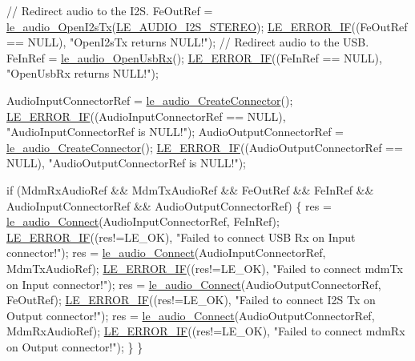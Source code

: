 \begin{DoxyCodeInclude}
{{{{    \textcolor{comment}{// Redirect audio to the I2S.}
    FeOutRef = \hyperlink{le__audio__interface_8h_a2633c1368adf60e342d7cadbbfa6278b}{le\_audio\_OpenI2sTx}(\hyperlink{le__audio__interface_8h_a94794180ed71a84bd26a1f525858f252a6ce77f5f956b203e15f662900a5103dd}{LE\_AUDIO\_I2S\_STEREO});
    \hyperlink{le__log_8h_aceaf11a11691d6c676e36dd317b38dbd}{LE\_ERROR\_IF}((FeOutRef == NULL), \textcolor{stringliteral}{"OpenI2sTx returns NULL!"});
    \textcolor{comment}{// Redirect audio to the USB.}
    FeInRef = \hyperlink{le__audio__interface_8h_acd8be89289067cef9441a8ed1d891146}{le\_audio\_OpenUsbRx}();
    \hyperlink{le__log_8h_aceaf11a11691d6c676e36dd317b38dbd}{LE\_ERROR\_IF}((FeInRef == NULL), \textcolor{stringliteral}{"OpenUsbRx returns NULL!"});

    AudioInputConnectorRef = \hyperlink{le__audio__interface_8h_a570aaf85086f00aca592acfbaaa237be}{le\_audio\_CreateConnector}();
    \hyperlink{le__log_8h_aceaf11a11691d6c676e36dd317b38dbd}{LE\_ERROR\_IF}((AudioInputConnectorRef == NULL), \textcolor{stringliteral}{"AudioInputConnectorRef is NULL!"});
    AudioOutputConnectorRef = \hyperlink{le__audio__interface_8h_a570aaf85086f00aca592acfbaaa237be}{le\_audio\_CreateConnector}();
    \hyperlink{le__log_8h_aceaf11a11691d6c676e36dd317b38dbd}{LE\_ERROR\_IF}((AudioOutputConnectorRef == NULL), \textcolor{stringliteral}{"AudioOutputConnectorRef is NULL!"});

    \textcolor{keywordflow}{if} (MdmRxAudioRef && MdmTxAudioRef && FeOutRef && FeInRef &&
        AudioInputConnectorRef && AudioOutputConnectorRef)
    \{
        res = \hyperlink{le__audio__interface_8h_a338df65b2fb1ae0140d86880adbcf0de}{le\_audio\_Connect}(AudioInputConnectorRef, FeInRef);
        \hyperlink{le__log_8h_aceaf11a11691d6c676e36dd317b38dbd}{LE\_ERROR\_IF}((res!=LE\_OK), \textcolor{stringliteral}{"Failed to connect USB Rx on Input connector!"});
        res = \hyperlink{le__audio__interface_8h_a338df65b2fb1ae0140d86880adbcf0de}{le\_audio\_Connect}(AudioInputConnectorRef, MdmTxAudioRef);
        \hyperlink{le__log_8h_aceaf11a11691d6c676e36dd317b38dbd}{LE\_ERROR\_IF}((res!=LE\_OK), \textcolor{stringliteral}{"Failed to connect mdmTx on Input connector!"});
        res = \hyperlink{le__audio__interface_8h_a338df65b2fb1ae0140d86880adbcf0de}{le\_audio\_Connect}(AudioOutputConnectorRef, FeOutRef);
        \hyperlink{le__log_8h_aceaf11a11691d6c676e36dd317b38dbd}{LE\_ERROR\_IF}((res!=LE\_OK), \textcolor{stringliteral}{"Failed to connect I2S Tx on Output connector!"});
        res = \hyperlink{le__audio__interface_8h_a338df65b2fb1ae0140d86880adbcf0de}{le\_audio\_Connect}(AudioOutputConnectorRef, MdmRxAudioRef);
        \hyperlink{le__log_8h_aceaf11a11691d6c676e36dd317b38dbd}{LE\_ERROR\_IF}((res!=LE\_OK), \textcolor{stringliteral}{"Failed to connect mdmRx on Output connector!"});
    \}
\}

}}}}
\end{DoxyCodeInclude}
